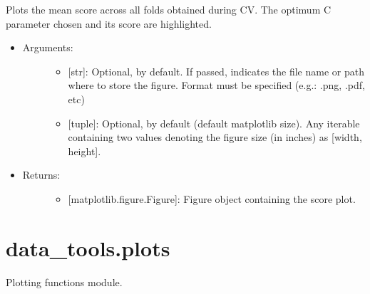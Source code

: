 \documentclass[letterpaper,10pt,english]{sphinxmanual}
\begin{document}
\begin{fulllineitems}
\begin{fulllineitems}
\label{\detokenize{models:data_tools.models.Lasso.plot_score}}
Plots the mean score across all folds obtained during CV.
The optimum C parameter chosen and its score are highlighted.
\begin{itemize}
\item {} \begin{description}
\item[{Arguments:}] \leavevmode\begin{itemize}
\item {} 
 {[}str{]}: Optional,  by default. If
passed, indicates the file name or path where to store the
figure. Format must be specified (e.g.: .png, .pdf, etc)

\item {} 
 {[}tuple{]}: Optional,  by default (default
matplotlib size). Any iterable containing two values
denoting the figure size (in inches) as {[}width, height{]}.

\end{itemize}

\end{description}

\item {} \begin{description}
\item[{Returns:}] \leavevmode\begin{itemize}
\item {} 
{[}matplotlib.figure.Figure{]}: Figure object containing the
score plot.

\end{itemize}

\end{description}

\end{itemize}

\end{fulllineitems}


\end{fulllineitems}

\label{\detokenize{plots:module-data_tools.plots}}

\section{data\_tools.plots}
\label{\detokenize{plots:data-tools-plots}}\label{\detokenize{plots::doc}}
Plotting functions module.
\end{document}
